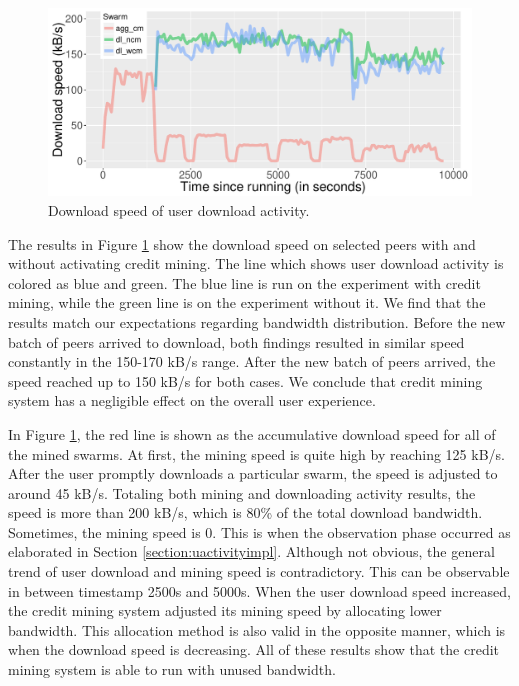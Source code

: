 \begin{figure}[h!]
		\centering
		\includegraphics[width=\textwidth]{pics/results/pr_g2-act2.pdf}
		\caption{Download speed of user download activity.}
		\label{fig:cmprio}
\end{figure}

The results in Figure \ref{fig:cmprio} show the download speed on selected peers with and without activating credit mining. The line which shows user download activity is colored as blue and green. The blue line is run on the experiment with credit mining, while the green line is on the experiment without it. We find that the results match our expectations regarding bandwidth distribution. Before the new batch of peers arrived to download, both findings resulted in similar speed constantly in the 150-170 kB/s range. After the new batch of peers arrived, the speed reached up to 150 kB/s for both cases. We conclude that credit mining system has a negligible effect on the overall user experience. 

In Figure \ref{fig:cmprio}, the red line is shown as the accumulative download speed for all of the mined swarms. At first, the mining speed is quite high by reaching 125 kB/s. After the user promptly downloads a particular swarm, the speed is adjusted to around 45 kB/s. Totaling both mining and downloading activity results, the speed is more than 200 kB/s, which is 80\% of the total download bandwidth. Sometimes, the mining speed is 0. This is when the observation phase occurred as elaborated in Section \ref{section:uactivityimpl}. Although not obvious, the general trend of user download and mining speed is contradictory. This can be observable in between timestamp 2500s and 5000s. When the user download speed increased, the credit mining system adjusted its mining speed by allocating lower bandwidth. This allocation method is also valid in the opposite manner, which is when the download speed is decreasing. All of these results show that the credit mining system is able to run with unused bandwidth. 

